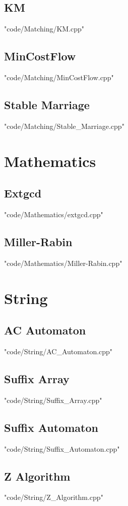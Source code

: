 \documentclass [landscape,8pt,a4paper,twocolumn]{article}
\begin{document}
\subsection{KM}
 {"code/Matching/KM.cpp"}
\subsection{MinCostFlow}
 {"code/Matching/MinCostFlow.cpp"}
\subsection{Stable Marriage}
 {"code/Matching/Stable_Marriage.cpp"}
\section{Mathematics}
\subsection{Extgcd}
 {"code/Mathematics/extgcd.cpp"}
\subsection{Miller-Rabin}
 {"code/Mathematics/Miller-Rabin.cpp"}
\section{String}
\subsection{AC Automaton}
 {"code/String/AC_Automaton.cpp"}
\subsection{Suffix Array}
 {"code/String/Suffix_Array.cpp"}
\subsection{Suffix Automaton}
 {"code/String/Suffix_Automaton.cpp"}
\subsection{Z Algorithm}
 {"code/String/Z_Algorithm.cpp"}
\end{document}
